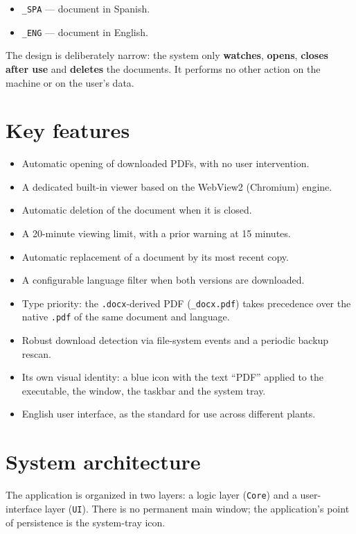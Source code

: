 \documentclass[11pt,a4paper]{article}
\begin{document}
\begin{itemize}[leftmargin=1.4em,itemsep=2pt]
  \item \texttt{\_SPA} --- document in Spanish.
  \item \texttt{\_ENG} --- document in English.
\end{itemize}

The design is deliberately narrow: the system only \textbf{watches},
\textbf{opens}, \textbf{closes after use} and \textbf{deletes} the documents. It
performs no other action on the machine or on the user's data.

\section{Key features}
\begin{itemize}[leftmargin=1.4em,itemsep=3pt]
  \item Automatic opening of downloaded PDFs, with no user intervention.
  \item A dedicated built-in viewer based on the WebView2 (Chromium) engine.
  \item Automatic deletion of the document when it is closed.
  \item A 20-minute viewing limit, with a prior warning at 15 minutes.
  \item Automatic replacement of a document by its most recent copy.
  \item A configurable language filter when both versions are downloaded.
  \item Type priority: the \texttt{.docx}-derived PDF (\texttt{\_docx.pdf}) takes
        precedence over the native \texttt{.pdf} of the same document and language.
  \item Robust download detection via file-system events and a periodic
        backup rescan.
  \item Its own visual identity: a blue icon with the text ``PDF'' applied to the
        executable, the window, the taskbar and the system tray.
  \item English user interface, as the standard for use across different plants.
\end{itemize}

\section{System architecture}
The application is organized in two layers: a logic layer (\texttt{Core}) and a
user-interface layer (\texttt{UI}). There is no permanent main window; the
application's point of persistence is the system-tray icon.
\end{document}
